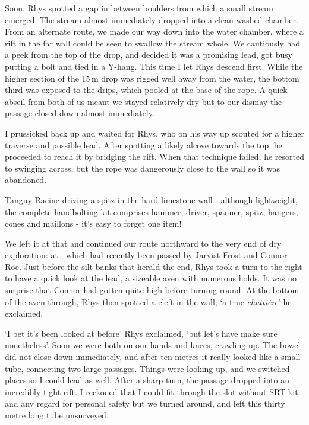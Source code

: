 Soon, Rhys spotted a gap in between boulders from which a small stream emerged. The stream almost immediately dropped into a clean washed chamber. From an alternate route, we made our way down into the water chamber, where a rift in the far wall could be seen to swallow the stream whole. We cautiously had a peek from the top of the drop, and decided it was a promising lead, got busy putting a bolt and tied in a Y-hang. This time I let Rhys descend first. While the higher section of the 15\,m drop was rigged well away from the water, the bottom third was exposed to the drips, which pooled at the base of the rope. A quick abseil from both of us meant we stayed relatively dry but to our dismay the passage closed down almost immediately. 

I prussicked back up and waited for Rhys, who on his way up scouted for a higher traverse and possible lead. After spotting a likely alcove towards the top, he proceeded to reach it by bridging the rift. When that technique failed, he resorted to swinging across, but the rope was dangerously close to the wall so it was abandoned.

\begin{marginfigure}
\checkoddpage \ifoddpage \forcerectofloat \else \forceversofloat \fi
\centering
 \caption{Tanguy Racine driving a spitz in the hard limestone wall - although lightweight, the complete handbolting kit comprises hammer, driver, spanner, spitz, hangers, cones and maillons - it's easy to forget one item! }
 \label{tanguy bolting}
\end{marginfigure}


We left it at that and continued our route northward to the very end of dry exploration: at , which had recently been passed by Jarvist Frost and Connor Roe.  Just before the silt banks that herald the end, Rhys took a turn to the right to have a quick look at the  lead, a sizeable aven with numerous holds. It was no surprise that Connor had gotten quite high before turning round. At the bottom of the aven through, Rhys then spotted a cleft in the wall, `a true \emph{chattière}' he exclaimed.

`I bet it's been looked at before' Rhys exclaimed, `but let's have make sure nonetheless'. Soon we were both on our hands and knees, crawling up. The bowel did not close down immediately, and after ten metres it really looked like a small tube, connecting two large passages. Things were looking up, and we switched places so I could lead as well. After a sharp turn, the passage dropped into an incredibly tight rift. I reckoned that I could fit through the slot without SRT kit and any regard for personal safety but we turned around, and left this thirty metre long tube unsurveyed. 

